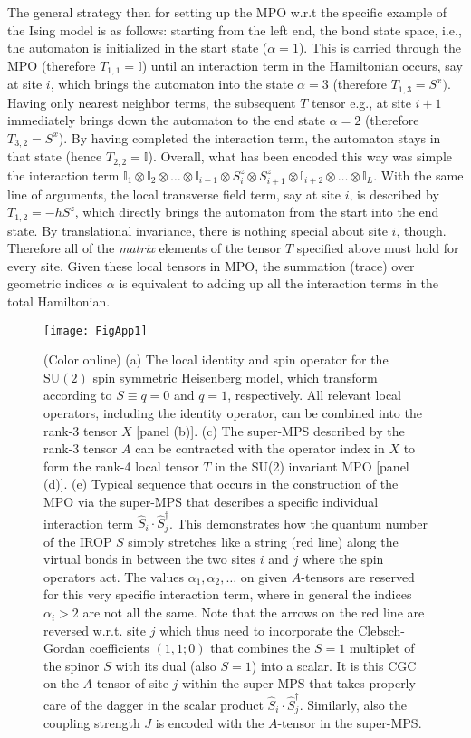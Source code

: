 \documentclass[aps,prx,twocolumn,showpacs,psfig,superscriptaddress,longbibliography]{revtex4-1}
\begin{document}
The general strategy then for setting up the MPO w.r.t the specific
example of the Ising model is as follows: starting from the left
end, the bond state space, i.e., the automaton is initialized in the
start state ($\alpha=1$). This is carried through the MPO (therefore
$T_{1,1}=\mathbb{I}$) until an interaction term in the Hamiltonian
occurs, say at site $i$, which brings the automaton into the state
$\alpha=3$ (therefore $T_{1,3}=S^x)$. Having only nearest neighbor
terms, the subsequent $T$ tensor e.g., at site $i+1$ immediately
brings down the automaton to the end state $\alpha=2$ (therefore
$T_{3,2}=S^x$).  By having completed the interaction term, the
automaton stays in that state (hence $T_{2,2}=\mathbb{I}$).
Overall, what has been encoded this way was simple the interaction
term $\mathbb{I}_1 \otimes \mathbb{I}_2 \otimes \ldots \otimes
\mathbb{I}_{i-1} \otimes S^z_{i} \otimes S^z_{i+1} \otimes
\mathbb{I}_{i+2} \otimes \ldots \otimes \mathbb{I}_{L}$.  With the
same line of arguments, the local transverse field term, say at site
$i$, is described by $T_{1,2}=-h S^z$, which directly brings the
automaton from the start into the end state. By translational
invariance, there is nothing special about site $i$, though.
Therefore all of the {\it matrix} elements of the tensor $T$
specified above must hold for every site.  Given these local tensors
in MPO, the summation (trace) over geometric indices $\alpha$ is
equivalent to adding up all the interaction terms in the total
Hamiltonian.

\begin{figure}[tbp]
\texttt{[image: FigApp1]}
\caption{(Color online)
%
(a) The local identity and spin operator
  for the $\mathrm{SU(2)}$ spin symmetric Heisenberg model,
  which transform according to $S \equiv q=0$ and $q=1$,
  respectively. All relevant local operators, including
  the identity operator, can be combined into the 
  rank-3 tensor $X$ [panel (b)].
%
(c) The super-MPS described by the rank-3 tensor $A$
  can be contracted with the operator index in $X$
  to form the rank-4 local tensor $T$ in the SU(2)
  invariant MPO [panel (d)].
%
(e) Typical sequence that occurs in the construction
  of the MPO via the super-MPS that describes a specific
  individual interaction term $\hat{S}_i
  \cdot \hat{S}_j^\dagger$.
  This demonstrates how the quantum number of the
  IROP $S$ simply stretches like a string (red line)
  along the virtual bonds in between the two sites
  $i$ and $j$ where the spin operators act.
  The values $\alpha_1,\alpha_2,\ldots$ on given
  $A$-tensors are reserved for this very specific
  interaction term, where in general the indices
  $\alpha_i>2$ are not all the same.
  Note that the arrows on the red line are reversed
  w.r.t. site $j$ which thus need to incorporate the
  Clebsch-Gordan coefficients $(1,1;0)$ that combines
  the $S=1$ multiplet of the spinor $S$ with its dual
  (also $S=1$) into a scalar. It is this CGC on
  the $A$-tensor of site $j$ within the super-MPS that
  takes properly care of the dagger in the scalar
  product $\hat{S}_i \cdot \hat{S}_j^\dagger$.
  Similarly, also the coupling strength $J$ is 
  encoded with the $A$-tensor in the super-MPS.
}
\label{Fig:SMPO}
\end{figure}
\end{document}
